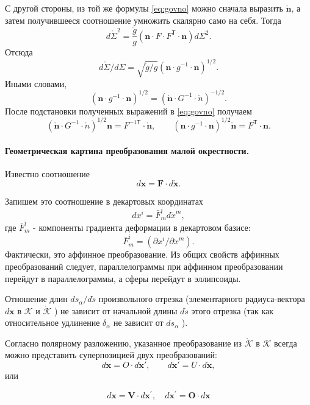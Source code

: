 С другой стороны, из той же формулы \eqref{eq:govno} можно сначала выразить $
\mathring{\mathbf{n}} $, а затем получившееся соотношение умножить скалярно само
на себя. Тогда  
\[
  d\mathring{\Sigma}^2 = \frac{\mathring{g}}{g}(\mathbf{n}\cdot F\cdot
  F^{\mathsf T}\cdot \mathbf{n})d\Sigma^2.
\]
Отсюда  
\[
  d\mathring{\Sigma}/d\Sigma = \sqrt{\mathring g/g}(\mathbf{n}\cdot g^{-1}\cdot
  \mathbf{n})^{1/2}.
\]
Иными словами,  
\[
  (\mathbf{n}\cdot g^{-1}\cdot \mathbf{n})^{1/2} = (\mathring{\mathbf{n}}\cdot
  G^{-1}\cdot \mathring{n})^{-1/2}.
\]
После подстановки полученных выражений в \eqref{eq:govno} получаем  
\[
    (\mathring{\mathbf{n}}\cdot
    G^{-1}\cdot \mathring{n})^{1/2} \mathbf{n} = F^{-1\mathsf T}\cdot
    \mathring{\mathbf{n}}, \qquad (\mathbf{n}\cdot g^{-1}\cdot \mathbf{n})^{1/2}
    \mathring{\mathbf{n}} = F^{\mathsf T} \cdot \mathbf{n}.
\]

\paragraph{Геометрическая картина преобразования малой окрестности.} 
Известно соотношение
\[ 
  d \mathbf{x}=\mathbf{F} \cdot d\mathring{\mathbf{x}}.
\]

Запишем это соотношение в декартовых координатах
\[ d x^{i}=\bar{F}_{m}^{i} d \mathring{x}^{m}, \]
где $\bar{F}_{m}^{i}$ - компоненты градиента деформации в декартовом базисе:
\[ \bar{F}_{m}^{i}=\left(\partial x^{i} / \partial \mathring{x}^m\right). \]
Фактически, это аффинное преобразование.
Из общих свойств аффинных преобразований следует, параллелограммы при аффинном
преобразовании перейдут в параллелограммы, а сферы перейдут в эллипсоиды.

Отношение длин $d s_{\alpha} / d\mathring{s}$
произвольного отрезка (элементарного радиуса-вектора $d \mathbf{x}$ в
$\mathcal{K}$ и $\mathring{\mathcal{K}}$ ) не зависит от начальной
длины $d \mathring{s}$ этого отрезка (так как относительное удлинение
$\delta_{\alpha}$ не зависит от $d s_{\alpha}$ ).

Согласно полярному разложению, указанное преобразование из $\mathring{\mathcal{K}}$ в
$\mathcal{K}$ всегда можно представить суперпозицией двух преобразований: 
\[
  d\mathbf{x} = O \cdot d\mathring{\mathbf{x}}', \qquad d\mathring{\mathbf{x}}'
  = U \cdot d\mathring{\mathbf{x}},
\]
или

\[ d \mathbf{x}=\mathbf{V} \cdot d \mathbf{x}^{\prime}, \quad d
\mathbf{x}^{\prime}=\mathbf{O} \cdot d \mathbf{x} \]

